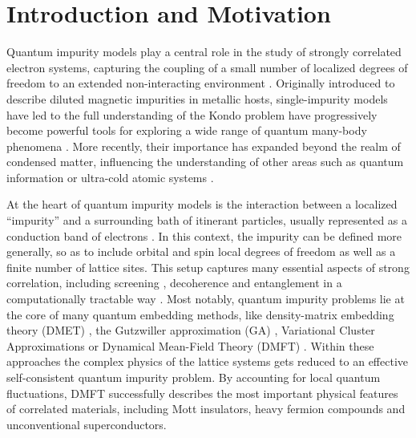 \documentclass[edipack_sp.tex]{subfiles}
\begin{document}
\section{Introduction and Motivation}\label{SecIntro}
Quantum impurity models play a central role in the study of strongly correlated electron systems, capturing the coupling of a small number of localized degrees of freedom to an extended non-interacting environment \cite{Nozieres1980JP,Hewson1993}. 
Originally introduced to describe diluted magnetic impurities in metallic hosts, single-impurity models have led to the full understanding of the Kondo problem \cite{Anderson1961PR,Kondo1964POTP,Schrieffer1966PR} have progressively become powerful tools for exploring a wide range of quantum many-body phenomena \cite{Wilson1975RMP,Georges1996RMP,Kotliar2004PT,Kotliar2006RMP}. More recently, their importance has expanded beyond the realm of condensed matter, influencing the understanding of other areas such as quantum information \cite{Su2013MPLB,Walsh2019PRL,Walsh2020PQ,Walsh2021PNAS,Stocker2022,Bellomia2024PRB} or ultra-cold atomic systems \cite{Dao2007PRL,Amaricci2014PRA,Del-Re2018PRA,Walsh2019PRB,Tusi2022NP}.


At the heart of quantum impurity models is the interaction between a localized ``impurity''  and a surrounding bath of itinerant particles, usually represented as a conduction band of electrons \cite{Hewson1993}. In this context, the  impurity  can be defined more generally, so as to include orbital and spin local degrees of freedom as well as a finite number of lattice sites. 
This setup captures many essential aspects of strong correlation, including screening \cite{Roekeghem2014PRL,Roekeghem2014EL,Werner2016JOPCM,Tomczak2017TEPJST}, decoherence and entanglement in a computationally tractable way \cite{Walsh2021PNAS,Bellomia2024PRB}.
Most notably, quantum impurity problems lie at the core of many quantum embedding methods, like density-matrix embedding theory (DMET) \cite{Knizia2012PRL}, the Gutzwiller approximation (GA) \cite{Lanata2015PRX,Mejuto-Zaera2023PRB},
Variational Cluster Approximations \cite{Potthoff2003TEPJBCMACS,Senechal2008,Potthoff2011ACP,Nuss2011,Dionne2023SPC,Dionne2023SPCa}
or Dynamical Mean-Field Theory (DMFT) \cite{Georges1996RMP, Kotliar2004PT,Kotliar2006RMP}.
Within these approaches the complex physics of the lattice systems gets reduced to an effective self-consistent quantum impurity problem.
By accounting for local quantum fluctuations, DMFT successfully describes the most important physical features of correlated materials, including Mott insulators, heavy fermion compounds and unconventional superconductors.  
\end{document}
